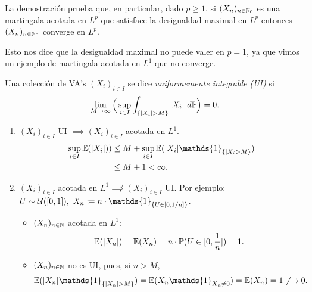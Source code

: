 \begin{remark}
	La demostración prueba que, en particular, dado $p \geq 1$, si $(X_{n})_{n \in \mathbb{N}_{0}}$ es una martingala acotada en $L^{p}$ que satisface la desigualdad maximal en $L^{p}$ entonces $(X_{n})_{n \in \mathbb{N}_{0}}$ converge en $L^{p}$. \par
	Esto nos dice que la desigualdad maximal no puede valer en $p = 1$, ya que vimos un ejemplo de martingala acotada en $L^{1}$ que no converge.
\end{remark}

\begin{definition}
	Una colección de VA's $(X_{i})_{i \in I}$ se dice \textit{uniformemente integrable (UI)} si
	\[ \lim_{M \to \infty} \Big( \sup_{i \in I} \int_{\{|X_{i}| > M\}} |X_{i}| \ d\mathbb{P} \Big) = 0. \]
\end{definition}

\begin{remark}
	\begin{enumerate}
		\item $(X_{i})_{i \in I}$ UI $\implies (X_{i})_{i \in I}$ acotada en $L^{1}$.
		\begin{align*}
			\sup_{i \in I} \mbb{E}(|X_{i}|)) &\leq M + \sup_{i \in I} \mbb{E}(|X_{i}| \mathds{1}_{\{|X_{i} > M\}}) \\
			&\leq M + 1 < \infty
		.\end{align*}

		\item $(X_{i})_{i \in I}$ acotada en $L^{1} \not\implies (X_{i})_{i \in I}$ UI. Por ejemplo: $U \sim \mcal{U}([0,1]),\ X_{n} \coloneq n \cdot \mathds{1}_{\{U \in [0,1 \slash n]\}}$.
		\begin{itemize}
			\item $(X_{n})_{n \in \mathbb{N}}$ acotada en $L^{1}$:
			\[ \mathbb{E}(|X_{n}|) = \mathbb{E}(X_{n}) = n \cdot \mathbb{P}(U \in [0, \frac{1}{n}]) = 1. \]

			\item $(X_{n})_{n \in \mathbb{N}}$ no es UI, pues, si $n > M$,
			\[ \mbb{E}(|X_{n}| \mathds{1}_{\{|X_{n}| > M\}}) = \mbb{E}(X_{n} \mathds{1}_{X_{n} \neq 0}) = \mbb{E}(X_{n}) = 1 \not\longrightarrow 0. \]
		\end{itemize}
	\end{enumerate}
\end{remark}

